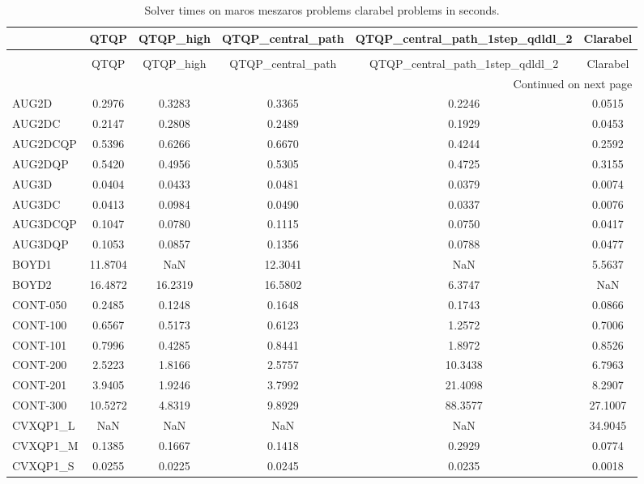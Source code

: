 \begin{longtable}{lccccc}
\caption{Solver times on maros meszaros problems clarabel problems in seconds.} \label{t-maros meszaros problems clarabel-results} \\
\toprule
 & QTQP & QTQP_high & QTQP_central_path & QTQP_central_path_1step_qdldl_2 & Clarabel \\
\midrule
\endfirsthead
\caption[]{Solver times on maros meszaros problems clarabel problems in seconds.} \\
\toprule
 & QTQP & QTQP_high & QTQP_central_path & QTQP_central_path_1step_qdldl_2 & Clarabel \\
\midrule
\endhead
\midrule
\multicolumn{6}{r}{Continued on next page} \\
\midrule
\endfoot
\bottomrule
\endlastfoot
AUG2D & 0.2976 & 0.3283 & 0.3365 & 0.2246 & 0.0515 \\
AUG2DC & 0.2147 & 0.2808 & 0.2489 & 0.1929 & 0.0453 \\
AUG2DCQP & 0.5396 & 0.6266 & 0.6670 & 0.4244 & 0.2592 \\
AUG2DQP & 0.5420 & 0.4956 & 0.5305 & 0.4725 & 0.3155 \\
AUG3D & 0.0404 & 0.0433 & 0.0481 & 0.0379 & 0.0074 \\
AUG3DC & 0.0413 & 0.0984 & 0.0490 & 0.0337 & 0.0076 \\
AUG3DCQP & 0.1047 & 0.0780 & 0.1115 & 0.0750 & 0.0417 \\
AUG3DQP & 0.1053 & 0.0857 & 0.1356 & 0.0788 & 0.0477 \\
BOYD1 & 11.8704 & NaN & 12.3041 & NaN & 5.5637 \\
BOYD2 & 16.4872 & 16.2319 & 16.5802 & 6.3747 & NaN \\
CONT-050 & 0.2485 & 0.1248 & 0.1648 & 0.1743 & 0.0866 \\
CONT-100 & 0.6567 & 0.5173 & 0.6123 & 1.2572 & 0.7006 \\
CONT-101 & 0.7996 & 0.4285 & 0.8441 & 1.8972 & 0.8526 \\
CONT-200 & 2.5223 & 1.8166 & 2.5757 & 10.3438 & 6.7963 \\
CONT-201 & 3.9405 & 1.9246 & 3.7992 & 21.4098 & 8.2907 \\
CONT-300 & 10.5272 & 4.8319 & 9.8929 & 88.3577 & 27.1007 \\
CVXQP1_L & NaN & NaN & NaN & NaN & 34.9045 \\
CVXQP1_M & 0.1385 & 0.1667 & 0.1418 & 0.2929 & 0.0774 \\
CVXQP1_S & 0.0255 & 0.0225 & 0.0245 & 0.0235 & 0.0018 \\

\end{longtable}
